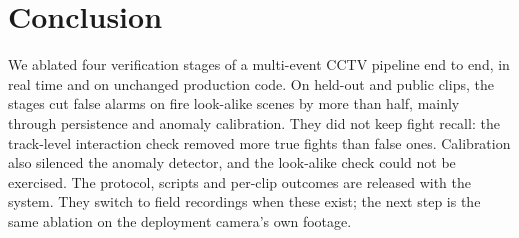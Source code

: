 \documentclass[conference]{IEEEtran}
\begin{document}
\section{Conclusion}
We ablated four verification stages of a multi-event CCTV pipeline end to end, in real time and on unchanged production code. On held-out and public clips, the stages cut false alarms on fire look-alike scenes by more than half, mainly through persistence and anomaly calibration. They did not keep fight recall: the track-level interaction check removed more true fights than false ones. Calibration also silenced the anomaly detector, and the look-alike check could not be exercised. The protocol, scripts and per-clip outcomes are released with the system. They switch to field recordings when these exist; the next step is the same ablation on the deployment camera's own footage.
\end{document}
